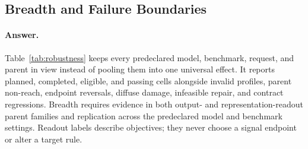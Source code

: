\subsection{Breadth and Failure Boundaries}
\label{sec:exp-supporting}

\paragraph{Answer.}
{\setlength{\emergencystretch}{3em}\TransferHeadline\par}

Table~\ref{tab:robustness} keeps every predeclared model, benchmark, request,
and parent in view instead of pooling them into one universal effect. It
reports planned, completed, eligible, and passing cells alongside invalid
profiles, parent non-reach, endpoint reversals, diffuse damage, infeasible
repair, and contract regressions. Breadth requires evidence in both output-
and representation-readout parent families and replication across the
predeclared model and benchmark settings. Readout labels describe objectives;
they never choose a signal endpoint or alter a target rule.
